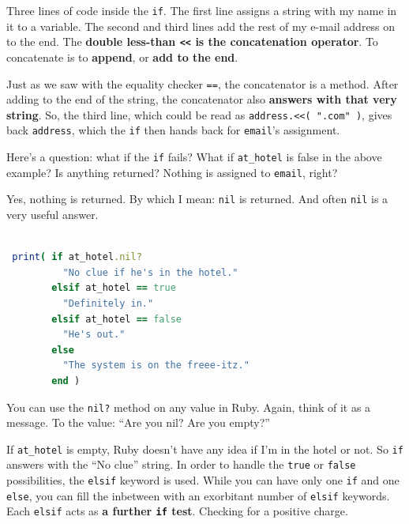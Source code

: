 \documentclass[10pt,twoside]{report}
\begin{document}
Three lines of code inside the \lstinline[breaklines=true]|if|.  The
first line assigns a string with my name in it to a variable. The
second and third lines add the rest of my e-mail address on to the
end.  The {\bf double less-than \lstinline[breaklines=true]|<<| is the
  concatenation operator}.  To concatenate is to {\bf append}, or {\bf
  add to the end}.

Just as we saw with the equality checker
\lstinline[breaklines=true]|==|, the concatenator is a method.  After
adding to the end of the string, the concatenator also {\bf answers
  with that very string}.  So, the third line, which could be read as
\lstinline[breaklines=true]|address.<<( ".com" )|, gives back
\lstinline[breaklines=true]|address|, which the
\lstinline[breaklines=true]|if| then hands back for
\lstinline[breaklines=true]|email|'s assignment.

Here's a question: what if the \lstinline[breaklines=true]|if| fails?
What if \lstinline[breaklines=true]|at_hotel| is false in the above
example? Is anything returned?  Nothing is assigned to
\lstinline[breaklines=true]|email|, right?

Yes, nothing is returned.  By which I mean:
\lstinline[breaklines=true]|nil| is returned.  And often
\lstinline[breaklines=true]|nil| is a very useful answer.


\begin{lstlisting}[basicstyle=\ttfamily\color{basiccolor},
    commentstyle = \ttfamily\color{commentcolor},
    keywordstyle=\ttfamily\color{keywordscolor},
    stringstyle=\color{stringcolor},
    language=Ruby,
    basicstyle=\small\ttfamily,
    showstringspaces=false,
  ]

 print( if at_hotel.nil?
          "No clue if he's in the hotel."
        elsif at_hotel == true
          "Definitely in."
        elsif at_hotel == false
          "He's out."
        else
          "The system is on the freee-itz."
        end )

\end{lstlisting}


You can use the \lstinline[breaklines=true]|nil?| method on any value
in Ruby.  Again, think of it as a message. To the value: ``Are you
nil?  Are you empty?''

If \lstinline[breaklines=true]|at_hotel| is empty, Ruby doesn't have
any idea if I'm in the hotel or not.  So
\lstinline[breaklines=true]|if| answers with the ``No clue'' string.
In order to handle the \lstinline[breaklines=true]|true| or
\lstinline[breaklines=true]|false| possibilities, the
\lstinline[breaklines=true]|elsif| keyword is used.  While you can
have only one \lstinline[breaklines=true]|if| and one
\lstinline[breaklines=true]|else|, you can fill the inbetween with an
exorbitant number of \lstinline[breaklines=true]|elsif| keywords.
Each \lstinline[breaklines=true]|elsif| acts as {\bf a further
  \lstinline[breaklines=true]|if| test}.  Checking for a positive
charge.
\end{document}
